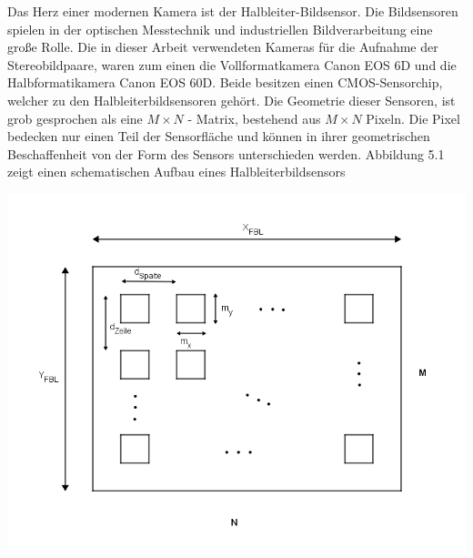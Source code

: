 %	


Das Herz einer modernen Kamera ist der Halbleiter-Bildsensor. Die Bildsensoren spielen in der optischen Messtechnik und industriellen Bildverarbeitung eine große Rolle\cite{Photonik}. Die in dieser Arbeit verwendeten Kameras für die Aufnahme der Stereobildpaare, waren zum einen die Vollformatkamera Canon EOS 6D und die Halbformatikamera Canon EOS 60D. Beide besitzen einen CMOS-Sensorchip, welcher zu den Halbleiterbildsensoren gehört\cite{Canon6D}. Die Geometrie dieser Sensoren, ist grob gesprochen als eine $M \times N$ - Matrix, bestehend aus $M \times N$ Pixeln. Die Pixel bedecken nur einen Teil der Sensorfläche und können in ihrer geometrischen Beschaffenheit von der Form des Sensors unterschieden werden\cite{Photonik}. Abbildung 5.1 zeigt einen schematischen Aufbau eines Halbleiterbildsensors\\

\begin{minipage}{\linewidth}
	\centering
	\includegraphics[width=.8\linewidth]{images/Bildsensor_mit_Pixel.png}
\end{minipage}\\ \\


